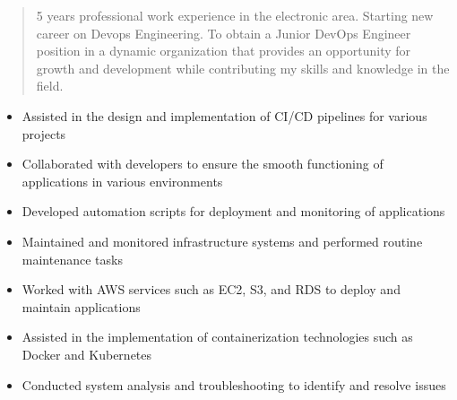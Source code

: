 \documentclass[10pt,a4paper,ragged2e,withhyper]{altacv}
\begin{document}
\begin{paracol}{2}
        
        
        \newpage
        
        \switchcolumn
        
            \begin{quote}
                5 years professional work experience in the electronic area. Starting new career on Devops Engineering. To obtain a Junior DevOps Engineer position in a dynamic organization that provides an opportunity for growth and development while contributing my skills and knowledge in the field.
            \end{quote}

  
        
            
            \begin{itemize}
                \item Assisted in the design and implementation of CI/CD pipelines for various projects
 \item Collaborated with developers to ensure the smooth functioning of applications in various environments
 \item Developed automation scripts for deployment and monitoring of applications
 \item Maintained and monitored infrastructure systems and performed routine maintenance tasks
 \item Worked with AWS services such as EC2, S3, and RDS to deploy and maintain applications
 \item Assisted in the implementation of containerization technologies such as Docker and Kubernetes
 \item Conducted system analysis and troubleshooting to identify and resolve issues
             \end{itemize}
             \divider
            

\end{paracol}
\end{document}
